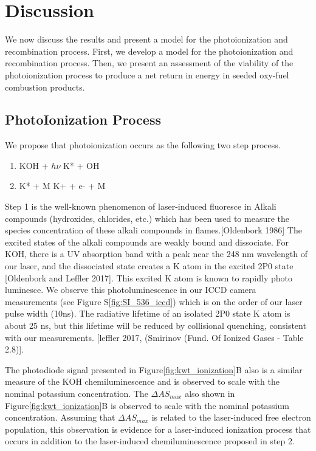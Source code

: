 \section{Discussion}

We now discuss the results and present a model for the photoionization and recombination process. First, we develop a model for the photoionization and recombination process. Then, we present an assessment of the viability of the photoionization process to produce a net return in energy in seeded oxy-fuel combustion products.

\subsection{PhotoIonization Process}

We propose that photoionization occurs as the following two step process. 

\begin{enumerate}
\item KOH + $h\nu$ \rightarrow K* + OH
\item K* + M \rightarrow K+ + e- + M
\end{enumerate}

Step 1 is the well-known phenomenon of laser-induced fluoresce in Alkali compounds (hydroxides, chlorides, etc.) which has been used to measure the species concentration of these alkali compounds in flames.[Oldenbork 1986] The excited states of the alkali compounds are weakly bound and dissociate. For KOH, there is a UV absorption band with a peak near the 248 nm wavelength of our laser, and the dissociated state creates a K atom in the excited 2P0 state [Oldenbork and Leffler 2017]. This excited K atom is known to rapidly photo luminesce. We observe this photoluminescence in our ICCD camera measurements (see Figure S\ref*{fig:SI_536_iccd}) which is on the order of our laser pulse width (10ns). The radiative lifetime of an isolated 2P0 state K atom is about 25 ns, but this lifetime will be reduced by collisional quenching, consistent with our measurements. [leffler 2017, (Smirinov (Fund. Of Ionized Gases - Table 2.8)]. 

The photodiode signal presented in Figure\ref{fig:kwt_ionization}B also is a similar measure of the KOH chemiluminescence and is observed to scale with the nominal potassium concentration. The $\Delta AS_{max}$ also shown in Figure\ref{fig:kwt_ionization}B is observed to scale with the nominal potassium concentration. Assuming that $\Delta AS_{max}$ is related to the laser-induced free electron population, this observation is evidence for a laser-induced ionization process that occurs in addition to the laser-induced chemiluminescence proposed in step 2. 

